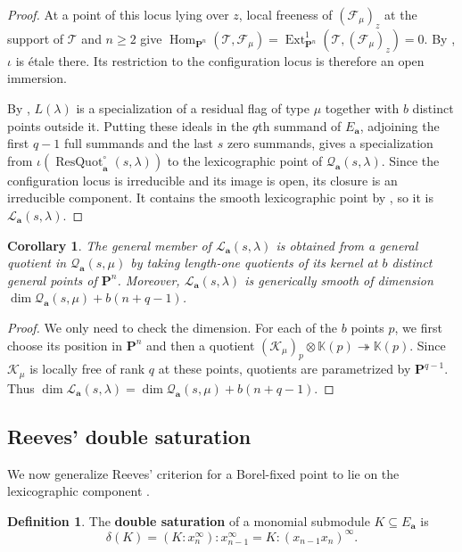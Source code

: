 \documentclass[leqno,11pt,a4paper]{amsart}
\newtheorem{cor}[cor]{Corollary}
\theoremstyle{definition}
\newtheorem{definition}[definition]{Definition}
\numberwithin{equation}{section}
\newcommand{\kk}{\mathbb{K}}
\newcommand{\bfa}{\mathbf{a}}
\newcommand{\PP}{\mathbf{P}}
\newcommand{\FF}{\mathscr{F}}
\newcommand{\KK}{\mathscr{K}}
\newcommand{\LL}{\mathcal{L}}
\newcommand{\QQ}{\mathcal{Q}}
\DeclareMathOperator{\Hom}{Hom}
\DeclareMathOperator{\Ext}{Ext}
\DeclareMathOperator{\ResQuot}{ResQuot}
\begin{document}
\begin{proof}
At a point of this locus lying over $z$, local freeness of $(\FF_\mu)_z$ at the support of $\mathscr{T}$ and $n \geq 2$ give $\Hom_{\PP^n}(\mathscr{T},\FF_\mu)=\Ext^1_{\PP^n}(\mathscr{T}, (\FF_\mu)_z)=0$.
By , $\iota$ is \'etale there. Its restriction to the configuration locus is therefore an open immersion.

By , $L(\lambda)$ is a specialization of a residual flag of type $\mu$ together with $b$ distinct points outside it.
Putting these ideals in the $q$th summand of $E_{\bfa}$, adjoining the first $q-1$ full summands and the last $s$ zero summands, gives a specialization from $\iota(\ResQuot_{\bfa}^{\circ}(s,\lambda))$ to the lexicographic point of $\QQ_{\bfa}(s,\lambda)$.
Since the configuration locus is irreducible and its image is open, its closure is an irreducible component. 
It contains the smooth lexicographic point by , so it is $\LL_{\bfa}(s,\lambda)$.
\end{proof}



\begin{cor} \label{lex_general_member}
The general member of $\LL_{\bfa}(s,\lambda)$ is obtained from a general quotient in $\QQ_{\bfa}(s,\mu)$
by taking length-one quotients of its kernel at $b$ distinct general points of $\PP^n$. 
Moreover, $\LL_{\bfa}(s,\lambda)$ is generically smooth of dimension $\dim\QQ_{\bfa}(s,\mu)+b(n+q-1)$.
\end{cor}
\begin{proof}
We only need to check the dimension. 
For each of the $b$ points $p$, we first choose its position in $\PP^n$ and then a quotient
$(\KK_\mu)_p \otimes \kk(p) \twoheadrightarrow \kk(p)$. 
Since $\KK_\mu$ is locally free of rank $q$ at these points, quotients are parametrized by $\PP^{q-1}$. 
Thus $\dim\LL_{\bfa}(s,\lambda) =\dim\QQ_{\bfa}(s,\mu)+b(n+q-1)$.
\end{proof}


\subsection{Reeves' double saturation}
We now generalize Reeves' criterion for a Borel-fixed point to lie on the lexicographic component \cite{Reeves_radius}.

\begin{definition} \label{double_sat}
The \textbf{double saturation} of a monomial submodule $K\subseteq E_{\bfa}$ is
$$
\delta(K)=(K:x_n^\infty):x_{n-1}^\infty = K:(x_{n-1}x_n)^\infty.
$$
\end{definition}
\end{document}
